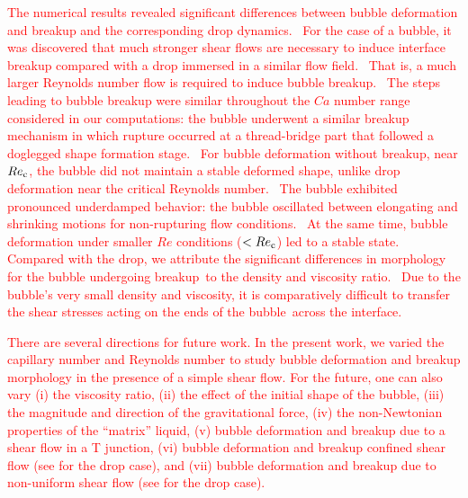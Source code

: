 \documentclass{elsarticle}
\begin{document}
\textcolor{red}{
The numerical results revealed significant differences between bubble deformation and breakup and the corresponding drop dynamics.  For the case of a bubble, it was discovered that much stronger shear flows are necessary to induce interface breakup compared with a drop immersed in a similar flow field.  That is, a much larger Reynolds number flow is required to induce bubble breakup.  The steps leading to bubble breakup were similar throughout the $Ca$ number range considered in our computations: the bubble underwent a similar breakup mechanism in which rupture occurred at a thread-bridge part that followed a doglegged shape formation stage.  For bubble deformation without breakup, near $Re_{\rm c}$, the bubble did not maintain a stable deformed shape, unlike drop deformation near the critical Reynolds number.  The bubble exhibited pronounced underdamped behavior: the bubble oscillated between elongating and shrinking motions for non-rupturing flow conditions.  At the same time, bubble deformation under smaller $Re$ conditions ($< Re_{\rm c}$) led to a stable state.  Compared with the drop, we attribute the significant differences in morphology for the bubble undergoing breakup to the density and viscosity ratio.  Due to the bubble's very small density and viscosity, it is comparatively difficult to transfer the shear stresses acting on the ends of the bubble across the interface.
}

\textcolor{red}{
There are several directions for future work.  In the present work, we varied the capillary number and Reynolds number to study bubble deformation and breakup morphology in the presence of a simple shear flow.  For the future, one can also vary (i) the viscosity ratio, (ii) the effect of the initial shape of the bubble\cite{ohta2005computational}, (iii) the magnitude and direction of the gravitational force, (iv) the non-Newtonian properties of the ``matrix'' liquid, (v) bubble deformation and breakup due to a shear flow in a T junction\cite{FRENSE2024120579}, (vi) bubble deformation and breakup confined shear flow (see \cite{gupta2014deformation} for the drop case), and (vii) bubble deformation and breakup due to non-uniform shear flow (see \cite{chin1980studies} for the drop case).
}


 


\end{document}
